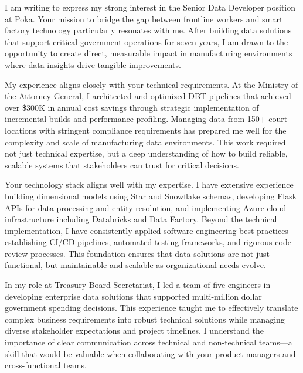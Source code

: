 \storeletterdate{\today}

\begin{storedcvletter}{
I am writing to express my strong interest in the Senior Data Developer position at Poka. Your mission to bridge the gap between frontline workers and smart factory technology particularly resonates with me. After building data solutions that support critical government operations for seven years, I am drawn to the opportunity to create direct, measurable impact in manufacturing environments where data insights drive tangible improvements.

My experience aligns closely with your technical requirements. At the Ministry of the Attorney General, I architected and optimized DBT pipelines that achieved over \$300K in annual cost savings through strategic implementation of incremental builds and performance profiling. Managing data from 150+ court locations with stringent compliance requirements has prepared me well for the complexity and scale of manufacturing data environments. This work required not just technical expertise, but a deep understanding of how to build reliable, scalable systems that stakeholders can trust for critical decisions.

Your technology stack aligns well with my expertise. I have extensive experience building dimensional models using Star and Snowflake schemas, developing Flask APIs for data processing and entity resolution, and implementing Azure cloud infrastructure including Databricks and Data Factory. Beyond the technical implementation, I have consistently applied software engineering best practices—establishing CI/CD pipelines, automated testing frameworks, and rigorous code review processes. This foundation ensures that data solutions are not just functional, but maintainable and scalable as organizational needs evolve.

In my role at Treasury Board Secretariat, I led a team of five engineers in developing enterprise data solutions that supported multi-million dollar government spending decisions. This experience taught me to effectively translate complex business requirements into robust technical solutions while managing diverse stakeholder expectations and project timelines. I understand the importance of clear communication across technical and non-technical teams—a skill that would be valuable when collaborating with your product managers and cross-functional teams.

}
\end{storedcvletter}
